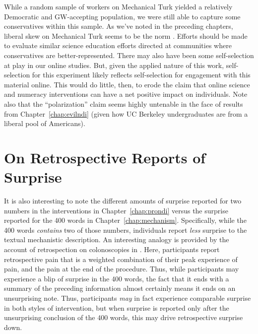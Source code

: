 While a random sample of workers on Mechanical Turk yielded a relatively
Democratic and GW-accepting population, we were still able to capture some
conservatives within this sample. As we've noted in the preceding chapters,
liberal skew on Mechanical Turk seems to be the norm
\parencite{richey_how_2012}. Efforts should be made to evaluate similar science
education efforts directed at communities where conservatives are
better-represented. There may also have been some self-selection at
play in our online studies. But, given the applied nature of this work,
self-selection for this experiment likely reflects self-selection for engagement
with this material online. This would do little, then, to erode the claim that
online science and numeracy interventions can have a net positive impact on
individuals. Note also that the “polarization” claim seems highly untenable in
the face of results from Chapter~\ref{chap:evilndi} (given how UC Berkeley
undergraduates are from a liberal pool of Americans).

\section{On Retrospective Reports of Surprise}

It is also interesting to note the different amounts of surprise reported for
two numbers in the interventions in Chapter~\ref{chap:prondi} versus the
surprise reported for the 400 words in Chapter~\ref{chap:mechanism}.
Specifically, while the 400 words \emph{contains} two of those numbers,
individuals report \emph{less} surprise to the textual mechanistic description.
An interesting analogy is provided by the account of retrospection on
colonoscopies in \textcite{kahneman_perspective_2003}. Here, participants report
retrospective pain that is a weighted combination of their peak experience of
pain, and the pain at the end of the procedure. Thus, while participants may
experience a blip of surprise in the 400 words, the fact that it ends with a
summary of the preceding information almost certainly means it ends on an
unsurprising note.  Thus, participants \emph{may} in fact experience comparable surprise
in both styles of intervention, but when surprise is reported only after the
unsurprising conclusion of the 400 words, this may drive retrospective surprise
down.

